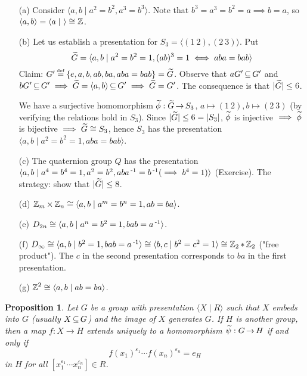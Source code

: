 \documentclass[11pt]{book}
\newcounter{counter}
\newtheorem{proposition}[counter]{Proposition}   \newtheorem{problem}[counter]{Problem}   \newtheorem*{proposition*}{Proposition}   \newtheorem*{lemma*}{Lemma}
\theoremstyle{definition}   \newtheorem{defn}[counter]{Definition} %
\newcommand{\ve}{\varepsilon}   \newcommand{\im}{\textnormal{im }}   \newcommand{\re}{\textnormal{Re }}   \newcommand{\mb}[1]{\mathbf{#1}}
\newcommand\myeq{\mathrel{\overset{\makebox[0pt]{\mbox{\normalfont\tiny\sffamily \textrm{def}}}}{=}}}
\newcommand{\gen}[1]{\langle #1 \rangle}   \newcommand{\stab}[2]{\tn{Stab}_{#1}(#2)}   \newcommand{\fix}[2]{\tn{Fix}_{#1}(#2)}
\DeclareMathOperator{\ra}{\rightarrow}   \DeclareMathOperator{\Poly}{\mathbf{P}}   \DeclareMathOperator{\spn}{\textnormal{span}}   \DeclareMathOperator{\aut}{\textnormal{Aut}}
\newcommand{\vs}{\vspace{8pt}}
\numberwithin{counter}{chapter}
\begin{document}
\begin{example}
\
\begin{enumerate}
\item[(a)] Consider $\gen{a,b \mid a^2 = b^2, a^3 = b^3}$. Note that $b^3 = a^3 = b^2 = a \implies b = a$, so $\gen{a,b} = \gen{a \mid \ } \cong \z$.

\item[(b)] Let us establish a presentation for $S_3 = \gen{(1\ 2), (2\ 3)}$. Put
	\[\wt{G} = \gen{a,b \mid a^2 = b^2 = 1, (ab)^3 = 1 \iff aba = bab} \]
Claim: $G' \myeq \{e,a,b,ab,ba,aba=bab\} = \wt{G}$. Observe that $aG' \operatorname{\subseteq} G'$ and $b G' \sub G' \implies \wt{G} = \gen{a,b} \sub G' \implies \wt{G} = G'$. The consequence is that $|\widetilde{G}| \leq 6$.

We have a surjective homomorphism $\wt{\phi} : \wt{G} \ra S_3$, $a \mapsto (1\ 2), b \mapsto (2\ 3)$  (by verifying the relations hold in $S_3$). Since $|\widetilde{G}| \leq 6 = |S_3|$, $\widetilde{\phi}$ is injective $\implies \widetilde{\phi}$ is bijective $\implies \widetilde{G} \cong S_3$, hence $S_3$ has the presentation $\gen{a,b \mid a^2 = b^2 = 1, aba = bab}$.

\item[(c)] The quaternion group $Q$ has the presentation $\gen{a,b \mid a^4 = b^4 = 1,a^2 = b^2, aba\inv = b\inv (\implies b^4 = 1)}$ (Exercise). The strategy: show that $|\widetilde{G}| \leq 8$.

\item[(d)] $\z_m \times \z_n \cong \gen{a,b \mid a^m = b^n = 1, ab = ba}$.

\item[(e)] $D_{2n} \cong \gen{a,b \mid a^n = b^2 = 1, bab = a\inv}$.

\item[(f)] $D_\infty \cong \gen{a,b \mid b^2 = 1, bab = a\inv} \cong \gen{b,c \mid b^2 = c^2 = 1} \cong \z_2 * \z_2$ ("free product"). The $c$ in the second presentation corresponds to $ba$ in the first presentation.

\item[(g)] $\z^2 \cong \gen{a,b \mid ab = ba}$.
\end{enumerate}
\end{example}

\vs

\begin{proposition}
Let $G$ be a group with presentation $\gen{X \mid R}$ such that $X$ embeds into $G$ (usually $X \operatorname{\subseteq} G$) and the image of $X$ generates $G$. If $H$ is another group, then a map $f : X \ra H$ extends uniquely to a homomorphism $\wt{\psi} : G \ra H$ if and only if
	\[f(x_1)^{\ve_1} \cdots f(x_n)^{\ve_n} = e_H \tag{$\ast$}\]
in $H$ for all $[x_1^{\ve_1} \cdots x_n^{\ve_n}] \in R$.
\end{proposition}
\end{document}
